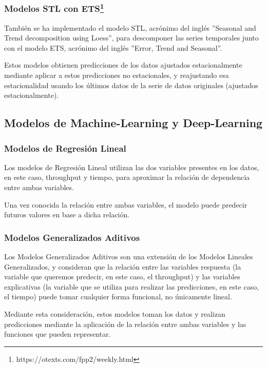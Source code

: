 \subsubsection*{Modelos STL con ETS\footnote{https://otexts.com/fpp2/weekly.html}}

También se ha implementado el modelo STL, acrónimo del inglés 
''Seasonal and Trend decomposition using Loess'', para descomponer las 
series temporales junto con el modelo ETS, acrónimo del inglés ''Error, Trend 
and Seasonal''.

Estos modelos obtienen predicciones de los datos ajustados estacionalmente mediante 
aplicar a estos predicciones no estacionales, y reajustando esa estacionalidad
usando los últimos datos de la serie de datos originales (ajustados estacionalmente).

\subsection{Modelos de Machine-Learning y Deep-Learning}

\subsubsection*{Modelos de Regresión Lineal}

Los modelos de Regresión Lineal utilizan las dos variables presentes en los datos,
en este caso, throughput y tiempo, para aproximar la relación de dependencia entre
ambas variables.

Una vez conocida la relación entre ambas variables, el modelo puede predecir futuros
valores en base a dicha relación.

\subsubsection*{Modelos Generalizados Aditivos}

Los Modelos Generalizados Aditivos son una extensión de los Modelos Lineales 
Generalizados, y consideran que la relación entre las variables respuesta (la variable
que queremos predecir, en este caso, el throughput) y las variables explicativas (la
variable que se utiliza para realizar las predicciones, en este caso, el tiempo) puede
tomar cualquier forma funcional, no únicamente lineal.

Mediante esta consideración, estos modelos toman los datos y realizan predicciones
mediante la aplicación de la relación entre ambas variables y las funciones que pueden
representar.

